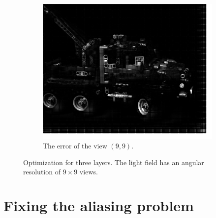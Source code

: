 \documentclass[11pt,a4paper,titlepage]{article}
\begin{document}
\begin{figure}[h]
\begin{subfigure}[t]{0.4\textwidth}
		\includegraphics[width=\textwidth]{results/legotruck_perspective_rec_3Layers_r=1/custom_view_error.png}
		\caption{The error of the view $\left( 9, 9 \right)$.}
	\end{subfigure}

	\caption{Optimization for three layers. The light field has an angular resolution of $9\times 9$ views.}
\end{figure}

\clearpage
\section{Fixing the aliasing problem}
\end{document}

